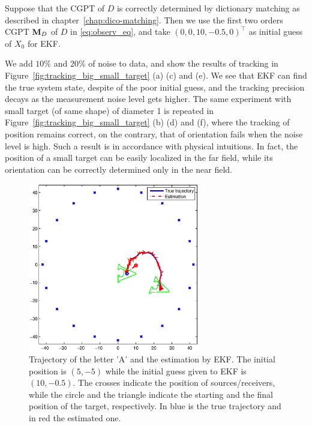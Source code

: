 Suppose that the CGPT of $D$ is correctly determined by
dictionary matching as described in chapter~\ref{chap:dico-matching}.
Then we use the first two orders CGPT
$\mathbf{M}_D$ of $D$ in \eqref{eq:observ_eq}, and take $(0, 0, 10, -0.5,
0)^\top$ as initial guess of $X_0$ for EKF.

We add $10\%$ and $20\%$ of noise to data, and show the results of tracking in
Figure~\ref{fig:tracking_big_small_target} (a) (c) and (e). We see that EKF can find
the true system state, despite of the poor initial guess, and the tracking precision
decays as the measurement noise level gets higher. The same experiment with small
target (of same shape) of diameter 1 is repeated in
Figure~\ref{fig:tracking_big_small_target} (b) (d) and (f), where the tracking of
position remains correct, on the contrary, that of orientation fails when the noise
level is high. Such a result is in accordance with physical intuitions. In fact, the
position of a small target can be easily localized in the far field, while its
orientation can be correctly determined only in the near field.


\begin{figure}[htp]
  \centering
  \includegraphics[width=7.5cm]{tracking/full_aov_1/tracking.eps}
  \caption{Trajectory of the letter 'A' and the estimation by EKF. The initial position is $(5, -5)$
    while the initial guess given to EKF is $(10, -0.5)$. The crosses indicate the position of
    sources/receivers, while the circle and the triangle indicate the starting and the final
    position of the target, respectively. In blue is the true trajectory and in red the estimated one.}
  \label{fig:target_path}
\end{figure}

